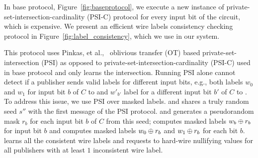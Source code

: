 In base protocol, Figure~\ref{fig:baseprotocol}, we execute a new instance of
private-set-intersection-cardinality (PSI-C) protocol for every input
bit of the circuit, which is expensive.  We present an efficient wire labels
consistency checking protocol in Figure~\ref{fig:label_consistency}, which we
use in our system.

This protocol uses Pinkas, et al.,~\cite{Pinkas0Z14} oblivious transfer (OT)
based private-set-intersection (PSI) as opposed to
private-set-intersection-cardinality (PSI-C) used in base protocol and only
\broker learns the intersection.  Running PSI alone cannot detect if a
publisher sends valid labels for different input bits, e.g., both labels $w_0$
and $w_1$ for input bit $b$ of $C$ to \garbler and $w'_{b'}$ label for a
different input bit $b'$ of $C$ to \broker. To address this issue, we use PSI
over masked labels.  \garbler and \broker shares a truly random seed $s''$ with
the first message of the PSI protocol.  \garbler and \broker generates a
pseudorandom mask $r_b$ for each input bit $b$ of $C$ from this seed; \broker
computes masked labels $w_b \oplus r_b$ for input bit $b$ and \garbler computes
masked labels $w_0 \oplus r_b$ and $w_1 \oplus r_b$ for each bit $b$. \broker
learns all the consistent wire labels and requests \garbler to hard-wire
nullifying values for all publishers with at least $1$ inconsistent wire label.\\[6pt]










